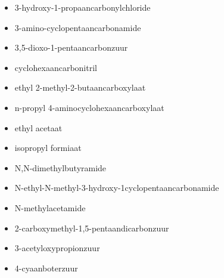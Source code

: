 \documentclass[a4paper,12pt]{article}
\begin{document}
\begin{enumerate}
\begin{enumerate}
\begin{itemize}
                    \item 3-hydroxy-1-propaancarbonylchloride
                    \item 3-amino-cyclopentaancarbonamide
                    \item 3,5-dioxo-1-pentaancarbonzuur
                    \item cyclohexaancarbonitril
                    \item ethyl 2-methyl-2-butaancarboxylaat
                    \item n-propyl 4-aminocyclohexaancarboxylaat
                    \item ethyl acetaat
                    \item isopropyl formiaat
                    \item N,N-dimethylbutyramide
                    \item N-ethyl-N-methyl-3-hydroxy-1cyclopentaancarbonamide
                    \item N-methylacetamide
                    \item 2-carboxymethyl-1,5-pentaandicarbonzuur
                    \item 3-acetyloxypropionzuur
                    \item 4-cyaanboterzuur
                \end{itemize}
        \end{enumerate}

\end{enumerate}
\end{document}
